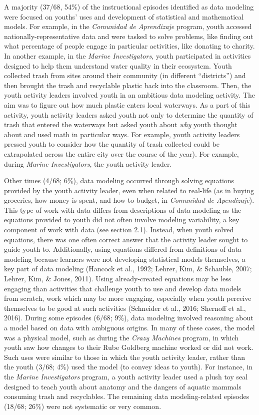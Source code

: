 \documentclass[]{book}
\theoremstyle{definition}
\theoremstyle{definition}
\theoremstyle{definition}
\theoremstyle{remark}
\begin{document}
A majority (37/68, 54\%) of the instructional episodes identified as
data modeling were focused on youths' uses and development of
statistical and mathematical models. For example, in the \emph{Comunidad
de Aprendizaje} program, youth accessed nationally-representative data
and were tasked to solve problems, like finding out what percentage of
people engage in particular activities, like donating to charity. In
another example, in the \emph{Marine Investigators}, youth participated
in activities designed to help them understand water quality in their
ecosystem. Youth collected trash from sites around their community (in
different ``districts'') and then brought the trash and recyclable
plastic back into the classroom. Then, the youth activity leaders
involved youth in an ambitious data modeling activity. The aim was to
figure out how much plastic enters local waterways. As a part of this
activity, youth activity leaders asked youth not only to determine the
quantity of trash that entered the waterways but asked youth about
\emph{why} youth thought about and used math in particular ways. For
example, youth activity leaders pressed youth to consider how the
quantity of trash collected could be extrapolated across the entire city
over the course of the year). For example, during \emph{Marine
Investigators}, the youth activity leader.

Other times (4/68; 6\%), data modeling occurred through solving
equations provided by the youth activity leader, even when related to
real-life (as in buying groceries, how money is spent, and how to
budget, in \emph{Comunidad de Apendizaje}). This type of work with data
differs from descriptions of data modeling as the equations provided to
youth did not often involve modeling variability, a key component of
work with data (see section 2.1). Instead, when youth solved equations,
there was one often correct answer that the activity leader sought to
guide youth to. Additionally, using equations differed from definitions
of data modeling because learners were not developing statistical models
themselves, a key part of data modeling (Hancock et al., 1992; Lehrer,
Kim, \& Schauble, 2007; Lehrer, Kim, \& Jones, 2011). Using
already-created equations may be less engaging than activities that
challenge youth to use and develop data models from scratch, work which
may be more engaging, especially when youth perceive themselves to be
good at such activities (Schneider et al., 2016; Shernoff et al., 2016).
During some episodes (6/68; 9\%), data modeling involved reasoning about
a model based on data with ambiguous origins. In many of these cases,
the model was a physical model, such as during the \emph{Crazy Machines}
program, in which youth saw how changes to their Rube Goldberg machine
worked or did not work. Such uses were similar to those in which the
youth activity leader, rather than the youth (3/68; 4\%) used the model
(to convey ideas to youth). For instance, in the \emph{Marine
Investigators} program, a youth activity leader used a plush toy seal
designed to teach youth about anatomy and the dangers of aquatic mammals
consuming trash and recyclables. The remaining data modeling-related
episodes (18/68; 26\%) were not systematic or very common.
\end{document}
